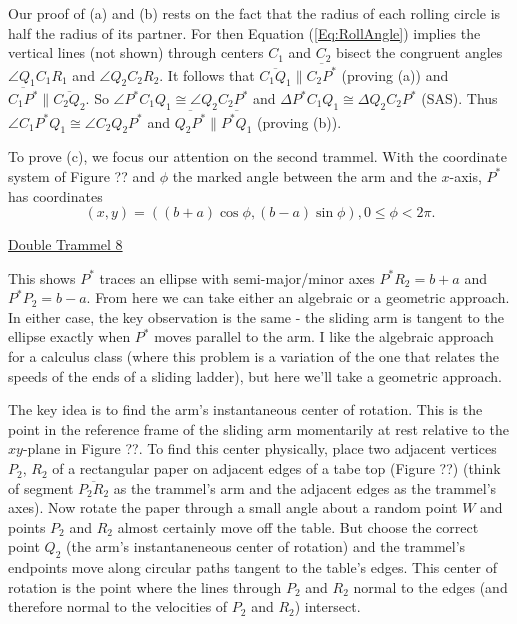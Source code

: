 \documentclass{ximera}
\begin{document}
Our proof of (a) and (b) rests on the fact that the radius of each rolling circle is half the radius of its partner. For then Equation
 (\ref{Eq:RollAngle}) implies the vertical lines (not shown) through centers $C_1$ and $C_2$ bisect the congruent angles $\angle Q_1C_1R_1$ and $\angle Q_2C_2R_2$. It follows that $\overline{C_1Q_1}\parallel \overline{C_2P^*}$ (proving (a)) and $\overline{C_1P^*}\parallel \overline{C_2Q_2}$. So $\angle P^*C_1Q_1\cong \angle Q_2C_2P^*$ and $\Delta P^* C_1Q_1 \cong \Delta Q_2C_2P^*$ (SAS). Thus $\angle C_1P^*Q_1 \cong \angle C_2Q_2P^*$ and $\overline{Q_2P^*}\parallel \overline{P^*Q_1}$ (proving (b)).




To prove (c), we focus our attention on the second trammel. With the coordinate system of Figure ?? and $\phi$ the marked angle between the arm and the $x$-axis, $P^*$ has coordinates 
\[
     (x,y) = ((b+a)\cos\phi, (b-a)\sin\phi) , 0\leq \phi <2\pi. 
\]

\begin{onlineOnly}
    \begin{center}
\end{center}
\end{onlineOnly}

\href{https://www.desmos.com/calculator/rqqjy9dakl}{Double Trammel 8}  %

This shows $P^*$ traces an ellipse with semi-major/minor axes $P^*R_2=b+a$ and $P^*P_2 = b-a$. From here we can take either an algebraic or a geometric approach. In either case, the key observation is the same - the sliding arm is tangent to the ellipse exactly when $P^*$ moves parallel to the arm. I like the algebraic approach for a calculus class (where this problem is a variation of the one that relates the speeds of the ends of a sliding ladder), but here we'll take a geometric approach.%


The key idea is to find the arm's instantaneous center of rotation. This is the point in the reference frame of the sliding arm momentarily at rest relative to the $xy$-plane in Figure ??. To find this center physically, place two adjacent vertices $P_2$, $R_2$ of a rectangular paper on adjacent edges of a tabe top (Figure ??) (think of segment $\overline{P_2R_2}$ as the trammel's arm and the adjacent edges as the trammel's axes). Now rotate the paper through a small angle about a random point $W$ and points $P_2$ and $R_2$ almost certainly move off the table. But choose the correct point $Q_2$ (the arm's instantaneneous center of rotation) and the trammel's endpoints move along circular paths tangent to the table's edges. This center of rotation is the point where the lines through $P_2$ and $R_2$ normal to the edges (and therefore normal to the velocities of $P_2$ and $R_2$) intersect.
\end{document}
